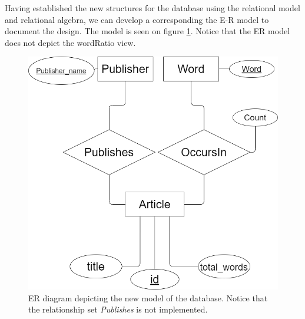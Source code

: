 Having established the new structures for the database using the relational model and relational algebra, we can develop a corresponding the E-R model to document the design. 
The model is seen on figure \ref{fig:newdatabaseRedesignER}. Notice that the ER model does not depict the wordRatio view.

\begin{figure}[H]
    \centering
    \includegraphics[scale=0.35]{Images/new ER.drawio.png}
    \caption{ER diagram depicting the new model of the database. Notice that the relationship set \textit{Publishes} is not implemented.}
    \label{fig:newdatabaseRedesignER}
\end{figure}